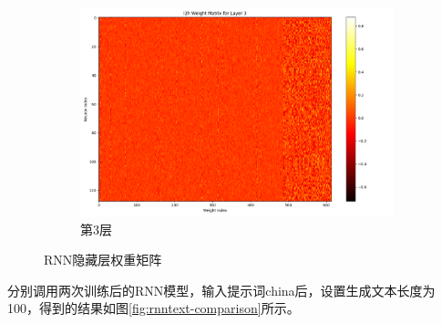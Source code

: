 \begin{figure}[H]
\begin{subfigure}{0.3\textwidth}
            \includegraphics[width=\linewidth]{../output/rnn/with scheduler/Weight Matrix for Layer 3.png}
            \caption{第3层}
            \label{fig:rnnweightmatrixforlayer3withscheduler}
        \end{subfigure}
        \caption{RNN隐藏层权重矩阵}
        \label{fig:rnnweightmatrixwithscheduler}
    \end{figure}

    分别调用两次训练后的RNN模型，输入提示词china后，设置生成文本长度为100，得到的结果如图\ref{fig:rnntext-comparison}所示。

